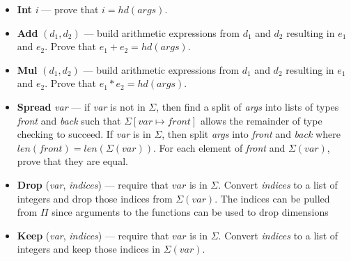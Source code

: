 \documentclass{article}
\begin{document}
\begin{enumerate}[label=\arabic*.]
\begin{itemize}
        \item \textbf{Int} \textit{i} --- prove that $i = hd(args)$.

        \item \textbf{Add} $(d_1, d_2)$ --- build arithmetic expressions from $d_1$ and $d_2$ resulting in $e_1$ and $e_2$. Prove that $e_1 + e_2 = hd(args)$.

        \item \textbf{Mul} $(d_1, d_2)$ --- build arithmetic expressions from $d_1$ and $d_2$ resulting in $e_1$ and $e_2$. Prove that $e_1 * e_2 = hd(args)$.

        \item \textbf{Spread} \textit{var} --- if \textit{var} is not in $\Sigma$, then find a split of \textit{args} into lists of types \textit{front} and \textit{back} such that $\Sigma[var \mapsto front]$ allows the remainder of type checking to succeed. If \textit{var} is in $\Sigma$, then split \textit{args} into \textit{front} and \textit{back} where $len(front) = len(\Sigma(var))$. For each element of \textit{front} and $\Sigma(var)$, prove that they are equal.

        \item \textbf{Drop} (\textit{var}, \textit{indices}) --- require that $var$ is in $\Sigma$. Convert \textit{indices} to a list of integers and drop those indices from $\Sigma(var)$. The indices can be pulled from $\Pi$ since arguments to the functions can be used to drop dimensions

        \item \textbf{Keep} (\textit{var}, \textit{indices}) --- require that $var$ is in $\Sigma$. Convert \textit{indices} to a list of integers and keep those indices in $\Sigma(var)$.
    \end{itemize}
\end{enumerate}
\end{document}
